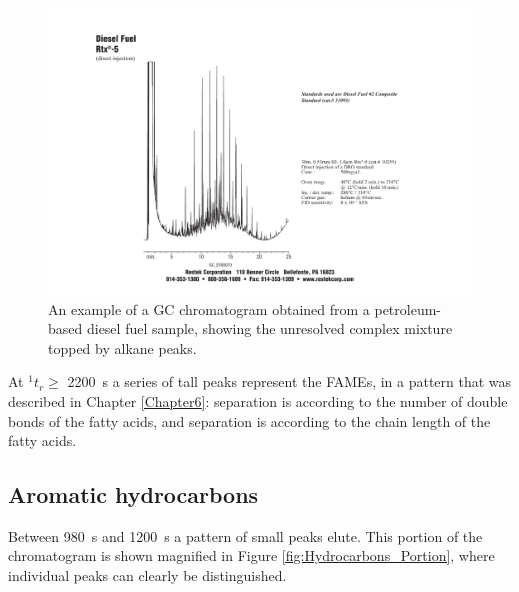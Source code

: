 \begin{figure}
	\centering
	\includegraphics[width=\textwidth]{Figures/hchump.pdf}
	\decoRule	
	
\caption[An example of a petrochemical fuel chromatogram.]{An example of a GC
chromatogram obtained from a petroleum-based diesel fuel sample, showing the
unresolved complex mixture topped by alkane peaks.}
	
	\label{fig:HCHump} 
\end{figure}

At \(^{1}t_{r} \geq \) \SI{2200}{\second} a series of tall peaks represent the
FAMEs, in a pattern that was described in Chapter \ref{Chapter6}: \oneD
separation is according to the number of double bonds of the fatty acids, and
\twoD separation is according to the chain length of the fatty acids.


\subsection{Aromatic hydrocarbons}

Between \SI{980}{\second} and \SI{1200}{\second} a pattern of small peaks elute.
This portion of the chromatogram is shown magnified in Figure
\ref{fig:Hydrocarbons_Portion}, where individual peaks can clearly be distinguished.

